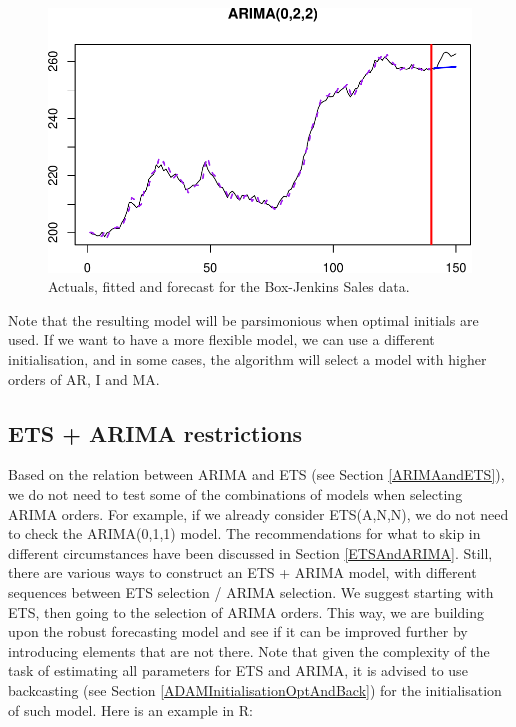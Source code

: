 \documentclass[
]{book}
\theoremstyle{definition}
\theoremstyle{definition}
\theoremstyle{definition}
\theoremstyle{definition}
\theoremstyle{remark}
\begin{document}
\begin{figure}
\centering
\includegraphics{Svetunkov--2022----ADAM_files/figure-latex/adamARIMAModelFitExample-1.pdf}
\caption{\label{fig:adamARIMAModelFitExample}Actuals, fitted and forecast for the Box-Jenkins Sales data.}
\end{figure}

Note that the resulting model will be parsimonious when optimal initials are used. If we want to have a more flexible model, we can use a different initialisation, and in some cases, the algorithm will select a model with higher orders of AR, I and MA.

\hypertarget{ets-arima-restrictions}{%
\subsection{ETS + ARIMA restrictions}\label{ets-arima-restrictions}}

Based on the relation between ARIMA and ETS (see Section \ref{ARIMAandETS}), we do not need to test some of the combinations of models when selecting ARIMA orders. For example, if we already consider ETS(A,N,N), we do not need to check the ARIMA(0,1,1) model. The recommendations for what to skip in different circumstances have been discussed in Section \ref{ETSAndARIMA}. Still, there are various ways to construct an ETS + ARIMA model, with different sequences between ETS selection / ARIMA selection. We suggest starting with ETS, then going to the selection of ARIMA orders. This way, we are building upon the robust forecasting model and see if it can be improved further by introducing elements that are not there. Note that given the complexity of the task of estimating all parameters for ETS and ARIMA, it is advised to use backcasting (see Section \ref{ADAMInitialisationOptAndBack}) for the initialisation of such model. Here is an example in R:
\end{document}

